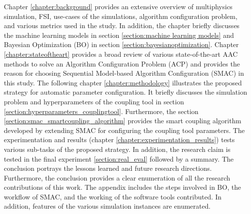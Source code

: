 Chapter \ref{chapter:background} provides an extensive overview of multiphysics simulation, FSI, use-cases of the simulations, algorithm configuration problem, and various metrics used in the study. In addition, the chapter briefly discusses the machine learning models in section \ref{section:machine learning models} and Bayesian Optimization (BO) in section \ref{section:bayesianoptimization}. Chapter \ref{chapter:stateoftheart} provides a broad review of various state-of-the-art AAC methods to solve an Algorithm Configuration Problem (ACP) and provides the reason for choosing Sequential Model-based Algorithm Configuration (SMAC) in this study. The following chapter \ref{chapter:methodology} illustrates the proposed strategy for automatic parameter configuration. It briefly discusses the simulation problem and hyperparameters of the coupling tool in section \ref{section:hyperparameters_couplingtool}. Furthermore, the section \ref{section:smac_smartcoupling_algorithm} provides the smart coupling algorithm developed by extending SMAC for configuring the coupling tool parameters. The experimentation and results (chapter \ref{chapter:experimentation_results}) tests various sub-tasks of the proposed strategy. In addition, the research claim is tested in the final experiment \ref{section:real_eval} followed by a summary. The conclusion portrays the lessons learned and future research directions. Furthermore, the conclusion provides a clear enumeration of all the research contributions of this work. The appendix includes the steps involved in BO, the workflow of SMAC, and the working of the software tools contributed. In addition, features of the various simulation instances are enumerated.   